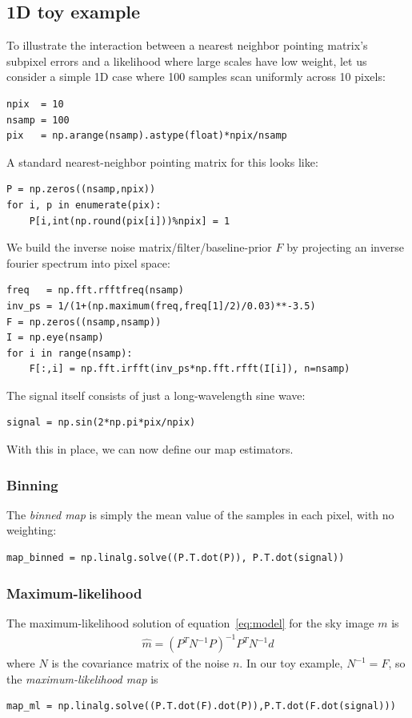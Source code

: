\documentclass[twocolumn,apj]{aastex63}
\begin{document}
\subsection{1D toy example}
To illustrate the interaction between a nearest neighbor pointing matrix's
subpixel errors and a likelihood where large scales have low weight, let
us consider a simple 1D case where 100 samples scan uniformly across 10 pixels:
\begin{lstlisting}
npix  = 10
nsamp = 100
pix   = np.arange(nsamp).astype(float)*npix/nsamp
\end{lstlisting}
A standard nearest-neighbor pointing matrix for this looks like:
\begin{lstlisting}
P = np.zeros((nsamp,npix))
for i, p in enumerate(pix):
	P[i,int(np.round(pix[i]))%npix] = 1
\end{lstlisting}
We build the inverse noise matrix/filter/baseline-prior $F$ by
projecting an inverse fourier spectrum into pixel space:
\begin{lstlisting}
freq   = np.fft.rfftfreq(nsamp)
inv_ps = 1/(1+(np.maximum(freq,freq[1]/2)/0.03)**-3.5)
F = np.zeros((nsamp,nsamp))
I = np.eye(nsamp)
for i in range(nsamp):
	F[:,i] = np.fft.irfft(inv_ps*np.fft.rfft(I[i]), n=nsamp)
\end{lstlisting}
The signal itself consists of just a long-wavelength sine wave:
\begin{lstlisting}
signal = np.sin(2*np.pi*pix/npix)
\end{lstlisting}
With this in place, we can now define our map estimators.

\subsubsection{Binning}
The \emph{binned map} is simply the mean value of the samples
in each pixel, with no weighting:
\begin{lstlisting}
map_binned = np.linalg.solve((P.T.dot(P)), P.T.dot(signal))
\end{lstlisting}

\subsubsection{Maximum-likelihood}
The maximum-likelihood solution of equation~\ref{eq:model} for the
sky image $m$ is
\begin{align}
	\hat m = (P^TN^{-1}P)^{-1}P^TN^{-1}d
\end{align}
where $N$ is the covariance matrix of the noise $n$.
In our toy example, $N^{-1} = F$, so the \emph{maximum-likelihood map}
is
\begin{lstlisting}
map_ml = np.linalg.solve((P.T.dot(F).dot(P)),P.T.dot(F.dot(signal)))
\end{lstlisting}
\end{document}
